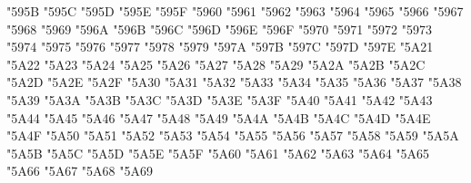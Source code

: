 {\Uchar\jis"595B %
\Uchar\jis"595C %
\Uchar\jis"595D %
\Uchar\jis"595E %
\Uchar\jis"595F %
\Uchar\jis"5960 %
\Uchar\jis"5961 %
\Uchar\jis"5962 %
\Uchar\jis"5963 %
\Uchar\jis"5964 %
\Uchar\jis"5965 %
\Uchar\jis"5966 %
\Uchar\jis"5967 %
\Uchar\jis"5968 %
\Uchar\jis"5969 %
\Uchar\jis"596A %
\Uchar\jis"596B %
\Uchar\jis"596C %
\Uchar\jis"596D %
\Uchar\jis"596E %
\Uchar\jis"596F %
\Uchar\jis"5970 %
\Uchar\jis"5971 %
\Uchar\jis"5972 %
\Uchar\jis"5973 %
\Uchar\jis"5974 %
\Uchar\jis"5975 %
\Uchar\jis"5976 %
\Uchar\jis"5977 %
\Uchar\jis"5978 %
\Uchar\jis"5979 %
\Uchar\jis"597A %
\Uchar\jis"597B %
\Uchar\jis"597C %
\Uchar\jis"597D %
\Uchar\jis"597E %
\Uchar\jis"5A21 %
\Uchar\jis"5A22 %
\Uchar\jis"5A23 %
\Uchar\jis"5A24 %
\Uchar\jis"5A25 %
\Uchar\jis"5A26 %
\Uchar\jis"5A27 %
\Uchar\jis"5A28 %
\Uchar\jis"5A29 %
\Uchar\jis"5A2A %
\Uchar\jis"5A2B %
\Uchar\jis"5A2C %
\Uchar\jis"5A2D %
\Uchar\jis"5A2E %
\Uchar\jis"5A2F %
\Uchar\jis"5A30 %
\Uchar\jis"5A31 %
\Uchar\jis"5A32 %
\Uchar\jis"5A33 %
\Uchar\jis"5A34 %
\Uchar\jis"5A35 %
\Uchar\jis"5A36 %
\Uchar\jis"5A37 %
\Uchar\jis"5A38 %
\Uchar\jis"5A39 %
\Uchar\jis"5A3A %
\Uchar\jis"5A3B %
\Uchar\jis"5A3C %
\Uchar\jis"5A3D %
\Uchar\jis"5A3E %
\Uchar\jis"5A3F %
\Uchar\jis"5A40 %
\Uchar\jis"5A41 %
\Uchar\jis"5A42 %
\Uchar\jis"5A43 %
\Uchar\jis"5A44 %
\Uchar\jis"5A45 %
\Uchar\jis"5A46 %
\Uchar\jis"5A47 %
\Uchar\jis"5A48 %
\Uchar\jis"5A49 %
\Uchar\jis"5A4A %
\Uchar\jis"5A4B %
\Uchar\jis"5A4C %
\Uchar\jis"5A4D %
\Uchar\jis"5A4E %
\Uchar\jis"5A4F %
\Uchar\jis"5A50 %
\Uchar\jis"5A51 %
\Uchar\jis"5A52 %
\Uchar\jis"5A53 %
\Uchar\jis"5A54 %
\Uchar\jis"5A55 %
\Uchar\jis"5A56 %
\Uchar\jis"5A57 %
\Uchar\jis"5A58 %
\Uchar\jis"5A59 %
\Uchar\jis"5A5A %
\Uchar\jis"5A5B %
\Uchar\jis"5A5C %
\Uchar\jis"5A5D %
\Uchar\jis"5A5E %
\Uchar\jis"5A5F %
\Uchar\jis"5A60 %
\Uchar\jis"5A61 %
\Uchar\jis"5A62 %
\Uchar\jis"5A63 %
\Uchar\jis"5A64 %
\Uchar\jis"5A65 %
\Uchar\jis"5A66 %
\Uchar\jis"5A67 %
\Uchar\jis"5A68 %
\Uchar\jis"5A69 %
}
